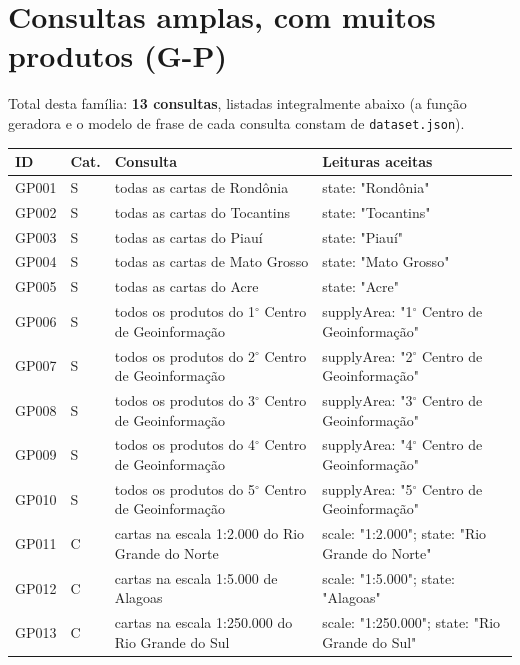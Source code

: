 \section{Consultas amplas, com muitos produtos (G-P)}

Total desta fam\'ilia: \textbf{13 consultas}, listadas integralmente abaixo (a fun\c{c}\~ao geradora e o modelo de frase de cada consulta constam de \texttt{dataset.json}).

{\footnotesize
\begin{longtable}{|p{1.1cm}|p{1.3cm}|p{5.4cm}|p{6.3cm}|}
\hline
\textbf{ID} & \textbf{Cat.} & \textbf{Consulta} & \textbf{Leituras aceitas} \\ \hline
\endhead
GP001 & S & todas as cartas de Rondônia & state: "Rondônia" \\ \hline
GP002 & S & todas as cartas do Tocantins & state: "Tocantins" \\ \hline
GP003 & S & todas as cartas do Piauí & state: "Piauí" \\ \hline
GP004 & S & todas as cartas de Mato Grosso & state: "Mato Grosso" \\ \hline
GP005 & S & todas as cartas do Acre & state: "Acre" \\ \hline
GP006 & S & todos os produtos do 1$^\circ$ Centro de Geoinformação & supplyArea: "1$^\circ$ Centro de Geoinformação" \\ \hline
GP007 & S & todos os produtos do 2$^\circ$ Centro de Geoinformação & supplyArea: "2$^\circ$ Centro de Geoinformação" \\ \hline
GP008 & S & todos os produtos do 3$^\circ$ Centro de Geoinformação & supplyArea: "3$^\circ$ Centro de Geoinformação" \\ \hline
GP009 & S & todos os produtos do 4$^\circ$ Centro de Geoinformação & supplyArea: "4$^\circ$ Centro de Geoinformação" \\ \hline
GP010 & S & todos os produtos do 5$^\circ$ Centro de Geoinformação & supplyArea: "5$^\circ$ Centro de Geoinformação" \\ \hline
GP011 & C & cartas na escala 1:2.000 do Rio Grande do Norte & scale: "1:2.000"; state: "Rio Grande do Norte" \\ \hline
GP012 & C & cartas na escala 1:5.000 de Alagoas & scale: "1:5.000"; state: "Alagoas" \\ \hline
GP013 & C & cartas na escala 1:250.000 do Rio Grande do Sul & scale: "1:250.000"; state: "Rio Grande do Sul" \\ \hline
\end{longtable}
\addtocounter{table}{-1}
}

